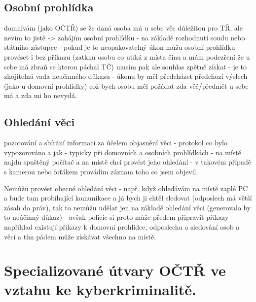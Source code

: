 \subsection{Osobní prohlídka}
domnívám (jako OČTŘ) se že daná osoba má u sebe věc důležitou pro TŘ, ale nevím to jistě -> zahájím osobní prohlídku - na základě rozhodnutí soudu nebo státního zástupce - pokud je to neopakovatelný úkon můžu osobní prohlídku provéset i bez příkazu (zatknu osobu co utíká z místa činu a mám podezření že u sebe má zbraň se kterou páchal TČ) musím pak ale souhlas zpětně získat - je to zhojitelná vada neučinného důkazu - úkonu by měl předcházet předchozí výslech (jako u domovní prohlídky) což bych osobu měl požádat zda věč/předmět u sebe má a zda mi ho nevydá.

\subsection{Ohledání věci}
pozorování a sbírání informací za účelem objasnění věci - protokol co bylo vypozorováno a jak - typicky při domovních a osobních prohlídkách - na místě najdu spuštěný počítač a na místě chci provést jeho ohledání - v takovém případě s kamerou nebo foťákem provádím záznam toho co jsem objevil.

Nemůžu provést obecné ohledání věci - např. když ohledávám na místě zaplé PC a bude tam probíhající komunikace a já bych ji chtěl sledovat (odposlech má větší zásah do práv), tak to nemůžu udělat jen na základě ohledání věci (generovalo by to neúčinný důkaz) - avšak policie si proto může předem připravit příkazy- například existují příkazy k domovní prohlídce, odposlechu a sledování osob a věcí a tím pádem může získávat všechno na místě.

\newpage
\section{Specializované útvary OČTŘ ve vztahu ke kyberkriminalitě.}
